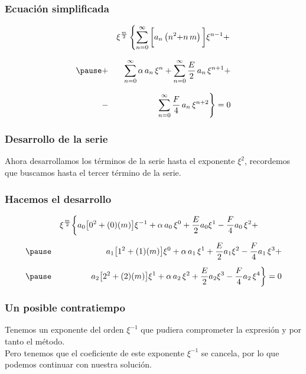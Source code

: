 \documentclass[12pt]{beamer}
\begin{document}
\begin{frame}
\frametitle{Ecuación simplificada}
\vspace{-1cm}
\begin{eqnarray*}
&{}& \xi^{\frac{m}{2}} \left\{ \sum_{n=0}^{\infty} \bigg[ a_{n} \left( n^{2} {+} n \, m \right) \bigg] \xi^{n-1} +  \right. \\[0.75em] \pause
&+& \sum_{n=0}^{\infty} \alpha \, a_{n} \, \xi^{n} + \sum_{n=0}^{\infty} \dfrac{E}{2} \, a_{n} \, \xi^{n+1} + \\[0.75em] 
&-& \left. \sum_{n=0}^{\infty} \dfrac{F}{4} \, a_{n} \, \xi^{n+2} \right\} = 0
\end{eqnarray*}
\end{frame}
\begin{frame}
\frametitle{Desarrollo de la serie}
Ahora desarrollamos los términos de la serie hasta el exponente  $\xi^{2}$, recordemos que buscamos hasta el tercer término de la serie.
\end{frame}
\begin{frame}
\frametitle{Hacemos el desarrollo}
\begin{eqnarray*}
&{}& \xi^{\frac{m}{2}} \bigg\{ a_{0} \big[ 0^{2} + (0)(m) \big] \xi^{-1} + \alpha \, a_{0} \, \xi^{0} + \dfrac{E}{2} a_{0} \xi^{1} - \dfrac{F}{4} a_{0} \, \xi^{2} + \hspace{1cm} \\[0.5em] \pause
&{}& a_{1} \big[ 1^{2} + (1)(m) \big] \xi^{0} + \alpha \, a_{1} \, \xi^{1} + \dfrac{E}{2} a_{1} \xi^{2} - \dfrac{F}{4} a_{1} \, \xi^{3} + \\[0.5em] \pause
&{}& a_{2} \big[ 2^{2} + (2)(m) \big] \xi^{1} + \alpha \, a_{2} \, \xi^{2} + \dfrac{E}{2} a_{2} \xi^{3} - \dfrac{F}{4} a_{2} \, \xi^{4} \bigg\} = 0
\end{eqnarray*}
\end{frame}
\begin{frame}
\frametitle{Un posible contratiempo}
Tenemos un exponente del orden $\xi^{-1}$ que pudiera comprometer la expresión y por tanto el método.
\\
\bigskip
\pause
Pero tenemos que el coeficiente de este exponente $\xi^{-1}$ se cancela, por lo que podemos continuar con nuestra solución.
\end{frame}
\end{document}
